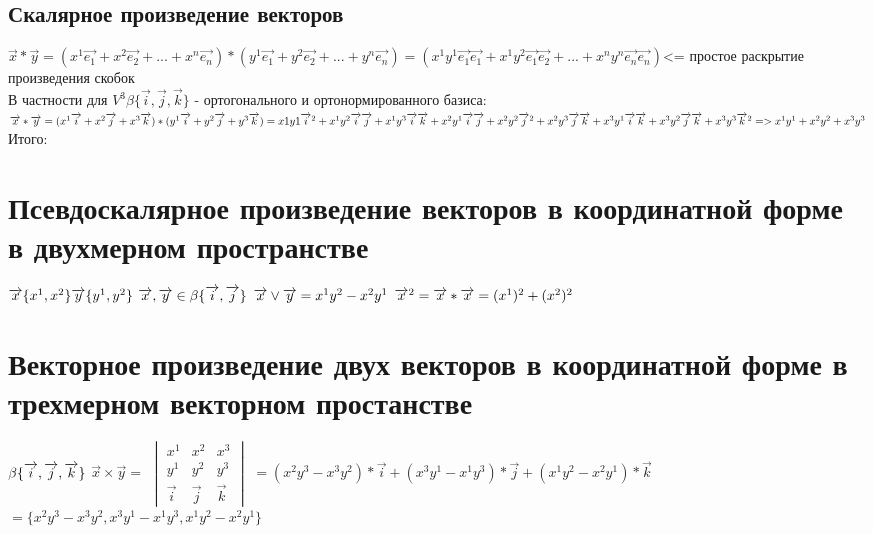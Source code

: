 \documentclass{book}
\begin{document}
\subsection{Скалярное произведение векторов}
$\overrightarrow{x}*\overrightarrow{y}=(x^1\overrightarrow{e_1}+x^2\overrightarrow{e_2}+...+x^n\overrightarrow{e_n})*(y^1\overrightarrow{e_1}+y^2\overrightarrow{e_2}+...+y^n\overrightarrow{e_n})=(x^1y^1\overrightarrow{e_1}\overrightarrow{e_1}+x^1y^2\overrightarrow{e_1}\overrightarrow{e_2}+...+x^ny^n\overrightarrow{e_n}\overrightarrow{e_n})$<= простое раскрытие произведения скобок\\
В частности для $V^3 \beta\{\overrightarrow{i},\overrightarrow{j},\overrightarrow{k}\}$ - ортогонального и ортонормированного базиса:\\
$\overrightarrow{x}*\overrightarrow{y}=(x^1\overrightarrow{i}+x^2\overrightarrow{j}+x^3\overrightarrow{k})*(y^1\overrightarrow{i}+y^2\overrightarrow{j}+y^3\overrightarrow{k})=x1y1\overrightarrow{i}^2+x^1y^2\overrightarrow{i}\overrightarrow{j}+x^1y^3\overrightarrow{i}\overrightarrow{k}+x^2y^1\overrightarrow{i}\overrightarrow{j}+x^2y^2\overrightarrow{j}^2+x^2y^3\overrightarrow{j}\overrightarrow{k}+x^3y^1\overrightarrow{i}\overrightarrow{k}+x^3y^2\overrightarrow{j}\overrightarrow{k}+x^3y^3\overrightarrow{k}^2 => x^1y^1+x^2y^2+x^3y^3\\$
Итого:
\section{Псевдоскалярное произведение векторов в координатной форме в двухмерном пространстве}
$\overrightarrow{x}\{x^1,x^2\}  \overrightarrow{y}\{y^1,y^2\}\\$
$\overrightarrow{x}, \overrightarrow{y} \in \beta\{\overrightarrow{i},\overrightarrow{j}\}\\$
$\overrightarrow{x}\vee\overrightarrow{y}=x^1y^2-x^2y^1\\$
$\overrightarrow{x}^2=\overrightarrow{x}*\overrightarrow{x}=(x^1)^2+(x^2)^2\\$
\section{Векторное произведение двух векторов в координатной форме в трехмерном векторном простанстве}
$\beta\{\overrightarrow{i},\overrightarrow{j},\overrightarrow{k}\}\\$
$\overrightarrow{x}\times\overrightarrow{y}=$
$\begin{vmatrix}
    x^1 & x^2 & x^3\\
    y^1 & y^2 & y^3\\
    \overrightarrow{i} & \overrightarrow{j} & \overrightarrow{k}
\end{vmatrix}$
$=(x^2y^3-x^3y^2)*\overrightarrow{i}+(x^3y^1-x^1y^3)*\overrightarrow{j}+(x^1y^2-x^2y^1)*\overrightarrow{k}$
$=\{x^2y^3-x^3y^2,x^3y^1-x^1y^3,x^1y^2-x^2y^1\}$
\end{document}

